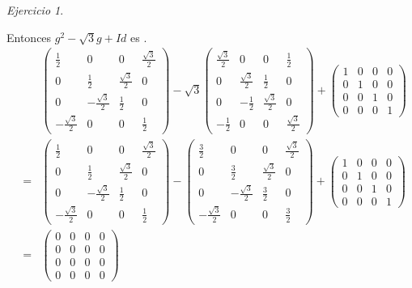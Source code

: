 \documentclass[11pt,a4paper]{article}
\theoremstyle{definition}
\theoremstyle{remark}
\newtheorem{exc}{Ejercicio}
\begin{document}
\begin{exc}
\begin{enumerate}
			Entonces $ g^2-\sqrt{3}g+Id $ es .
			\begin{eqnarray}
			& &\begin{pmatrix}
			\frac{1}{2} & 0 & 0 & \frac{\sqrt{3}}{2}
			\\ 0 & \frac{1}{2} & \frac{\sqrt{3}}{2} & 0 
			\\ 0 & -\frac{\sqrt{3}}{2} & \frac{1}{2} & 0
			\\ -\frac{\sqrt{3}}{2} & 0 & 0 & \frac{1}{2}
			\end{pmatrix}
			-\sqrt{3}\begin{pmatrix}
			\frac{\sqrt{3}}{2} & 0 & 0 & \frac{1}{2}
			\\ 0 & \frac{\sqrt{3}}{2} & \frac{1}{2} & 0 
			\\ 0 & -\frac{1}{2} & \frac{\sqrt{3}}{2} & 0
			\\ -\frac{1}{2} & 0 & 0 & \frac{\sqrt{3}}{2}
			\end{pmatrix}+
			\begin{pmatrix}
			1 & 0 & 0 & 0
			\\0 & 1 & 0 & 0
			\\0 & 0 & 1 & 0
			\\0 & 0 & 0 & 1
			\end{pmatrix} \nonumber
			 \\&=&
			\begin{pmatrix}
			\frac{1}{2} & 0 & 0 & \frac{\sqrt{3}}{2}
			\\ 0 & \frac{1}{2} & \frac{\sqrt{3}}{2} & 0 
			\\ 0 & -\frac{\sqrt{3}}{2} & \frac{1}{2} & 0
			\\ -\frac{\sqrt{3}}{2} & 0 & 0 & \frac{1}{2}
			\end{pmatrix}
			-\begin{pmatrix}
			\frac{3}{2} & 0 & 0 & \frac{\sqrt{3}}{2}
			\\ 0 & \frac{3}{2} & \frac{\sqrt{3}}{2} & 0 
			\\ 0 & -\frac{\sqrt{3}}{2} & \frac{3}{2} & 0
			\\ -\frac{\sqrt{3}}{2} & 0 & 0 & \frac{3}{2}
			\end{pmatrix}+
			\begin{pmatrix}
			1 & 0 & 0 & 0
			\\0 & 1 & 0 & 0
			\\0 & 0 & 1 & 0
			\\0 & 0 & 0 & 1
			\end{pmatrix} \nonumber
			\\&=&
			\begin{pmatrix}
			0 & 0 & 0 & 0
			\\0 & 0 & 0 & 0
			\\0 & 0 & 0 & 0
			\\0 & 0 & 0 & 0
			\end{pmatrix} \nonumber
			\end{eqnarray}
			\end{enumerate}
			

\end{exc}
\end{document}
